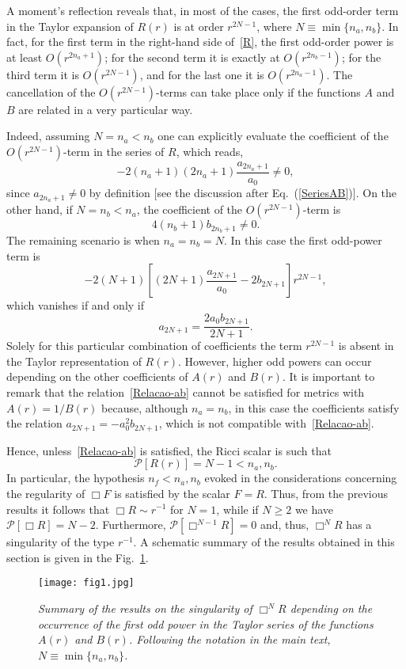 \documentclass[aps,prd,a4paper,twocolumn,showpacs,showkeys,preprintnumbers,amsmath,amssymb,nofootinbib,usenames,dvipsnames]{revtex4-2}
\def\beq{\begin{equation}}
\def\eeq{\end{equation}}
\newcommand{\eq}[1]{(\ref{#1})}
\begin{document}
A moment's reflection reveals that, in most of the cases, the first odd-order term in the Taylor expansion of $R(r)$ is at order $r^{2N-1}$, where $N\equiv\min\lbrace n_a, n_b\rbrace$. In fact, for the first term in the right-hand side of~\eqref{R}, the first odd-order power is at least $O(r^{2n_a+1})$; for the second term it is exactly at $O(r^{2n_b-1})$; for the third term it is $O(r^{2N-1})$, and for the last one it is $O(r^{2n_a-1})$. The cancellation of the $O(r^{2N-1})$-terms can take place only if the functions $A$ and $B$ are related in a very particular way.

Indeed, assuming $N = n_a < n_b$ one can explicitly evaluate the coefficient of the $O(r^{2N-1})$-term in the series of $R$, which reads,
%
\beq
- 2 (n_a + 1) (2n_a + 1) \frac{a_{2n_a+1}}{a_0} \neq 0,
\eeq
since $a_{2 n_a + 1} \neq 0$ by definition  [see the discussion after Eq.~\eq{SeriesAB}].
On the other hand, if $N = n_b < n_a$, the coefficient of the $O(r^{2N-1})$-term is
%
\beq
4 (n_b + 1) b_{2n_b+1} \neq 0.
\eeq
The remaining scenario is when $n_a = n_b = N$. In this case the first odd-power term is 
\beq \label{Coef_nA=nB}
- 2 (N+1) \left[  ( 2N + 1 ) \frac{a_{2N+1}}{a_0} - 2 b_{2N+1}  \right] r^{2N-1},
\eeq
which vanishes if and only if 
%
\beq \label{Relacao-ab}
a_{2N+1} =  \frac{2 a_0 b_{2N+1}}{2N + 1}.
\eeq
Solely for this particular combination of coefficients the term $r^{2N-1}$ is absent in the Taylor representation of $R(r)$. However, higher odd powers can occur depending on the other coefficients of $A(r)$ and $B(r)$. It is important to remark that the relation~\eqref{Relacao-ab} cannot be satisfied for metrics with $A(r) = 1/B(r)$ because, although $n_a = n_b$, in this case the coefficients satisfy the relation $a_{2N+1} = - a_0^2 b_{2N+1}$, which is not compatible with~\eqref{Relacao-ab}.

Hence, unless~\eqref{Relacao-ab} is satisfied, the Ricci scalar is such that 
\beq
\mathcal{P}[R(r)] = N - 1  < n_a, n_b.
\eeq 
In particular, the hypothesis $n_f < n_a, n_b$ evoked in the considerations concerning the regularity of $\Box F$ is satisfied by the scalar $F = R$. Thus, from the previous results
it follows that $\Box R \sim r^{-1}$ for $N=1$, while if $N \geqslant 2$ we have  
$\mathcal{P}[\Box R] = N-2$. Furthermore, $\mathcal{P}[\Box^{N-1} R] = 0$ and, thus, $\Box^{N} R$ has a singularity of the type $r^{-1}$. A schematic summary of the results obtained in this section is given in the Fig.~\ref{Fig1}.

\begin{figure}
\begin{center}
\texttt{[image: fig1.jpg]}
\caption{ \sl Summary of the results on the singularity of $\Box^N R$ depending on the occurrence of the first odd power in the Taylor series of the functions $A(r)$ and $B(r)$. Following the notation in the main text, $N\equiv\min\lbrace n_a, n_b\rbrace$.}
\label{Fig1}
\end{center}
\end{figure}
\end{document}
